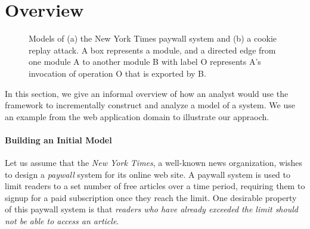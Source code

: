 
\section {Overview}
\label{sec-overview}

\begin{figure}[!t]
  \centering {}
  \hfil {}
\caption{Models of (a) the New York Times paywall system and (b)
  a cookie replay attack. A box represents a module, and a
  directed edge from one module \textsf{A} to another module
  \textsf{B} with label \textsf{O} represents \textsf{A}'s invocation
  of operation \textsf{O} that is exported by \textsf{B}.}
\label{fig-nytimes}
\end{figure}

In this section, we give an informal overview of how an analyst would
use the framework to incrementally construct and analyze a model of a
system. We use an example from the web application domain to
illustrate our appraoch.

\paragraph{\textbf{Building an Initial Model}} Let us assume that the
\textit{New York Times}, a well-known news organization, wishes to
design a \textit{paywall} system for its online web site. A paywall
system is used to limit readers to a set number of free articles over
a time period, requiring them to signup for a paid subscription once
they reach the limit. One desirable property of this paywall
system is that \textit{readers who have already exceeded the limit
  should not be able to access an article}.

